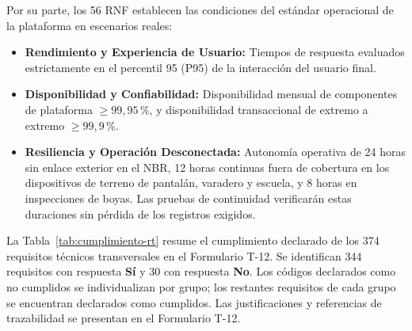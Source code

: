 Por su parte, los 56 RNF establecen las condiciones del estándar operacional de la plataforma en escenarios reales:
\begin{itemize}
    \item \textbf{Rendimiento y Experiencia de Usuario:} Tiempos de respuesta evaluados estrictamente en el percentil 95 (P95) de la interacción del usuario final.
    \item \textbf{Disponibilidad y Confiabilidad:} Disponibilidad mensual de componentes de plataforma $\ge 99,95\,\%$, y disponibilidad transaccional de extremo a extremo $\ge 99,9\,\%$.
    \item \textbf{Resiliencia y Operación Desconectada:} Autonomía operativa de 24 horas sin enlace exterior en el NBR, 12 horas continuas fuera de cobertura en los dispositivos de terreno de pantalán, varadero y escuela, y 8 horas en inspecciones de boyas. Las pruebas de continuidad verificarán estas duraciones sin pérdida de los registros exigidos.
\end{itemize}

La Tabla~\ref{tab:cumplimiento-rt} resume el cumplimiento declarado
de los 374 requisitos técnicos transversales en el Formulario T-12.
Se identifican 344 requisitos con respuesta \textbf{Sí} y 30 con
respuesta \textbf{No}. Los códigos declarados como no cumplidos se
individualizan por grupo; los restantes requisitos de cada grupo
se encuentran declarados como cumplidos. Las justificaciones y
referencias de trazabilidad se presentan en el Formulario T-12.


